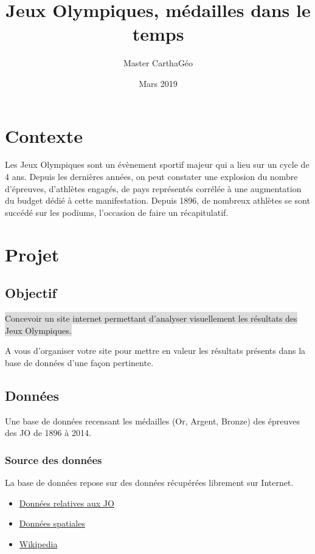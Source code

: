 \documentclass{article}
\title{Jeux Olympiques, médailles dans le temps}
\author{Master CarthaGéo}
\date{Mars 2019}
\begin{document}
\maketitle

\section{Contexte}

Les Jeux Olympiques sont un évènement sportif majeur qui a lieu sur un cycle de 4 ans. Depuis les dernières années, on peut constater une explosion du nombre d’épreuves, d’athlètes engagés, de pays représentés corrélée à une augmentation du budget dédié à cette manifestation.
Depuis 1896, de nombreux athlètes se sont succédé sur les podiums, l'occasion de faire un récapitulatif.

\section{Projet}

\subsection{Objectif}

\vspace{3mm}

\colorbox{Gainsboro}{
Concevoir un site internet permettant d’analyser visuellement les résultats des Jeux Olympiques.
}

\vspace{5mm}

A vous d'organiser votre site pour mettre en valeur les résultats présents dans la base de données d'une façon pertinente.

\subsection{Données}

Une base de données recensant les médailles (Or, Argent, Bronze) des épreuves des JO de 1896 à 2014.

\subsubsection{Source des données}

La base de données repose sur des données récupérées librement sur Internet.

\begin{itemize}

\item
\href{https://www.kaggle.com/the-guardian/olympic-games/home}{Données relatives aux JO}

\item
\href{http://www.naturalearthdata.com/downloads/10m-cultural-vectors/10m-admin-0-details/}{Données spatiales}

\item
\href{http://www.wikipedia.org}{Wikipedia}

\end{itemize}
\end{document}
